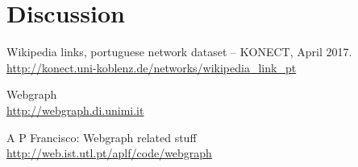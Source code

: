 \documentclass[9pt,a4paper]{article}
\begin{document}
\section{Discussion}

\begin{thebibliography}{9}
Wikipedia links, portuguese network dataset -- KONECT, April 2017.
\\ \url{http://konect.uni-koblenz.de/networks/wikipedia\_link\_pt}

Webgraph
\\ \url{http://webgraph.di.unimi.it}

A P Francisco: Webgraph related stuff
\\ \url{http://web.ist.utl.pt/aplf/code/webgraph}

\end{thebibliography}
\end{document}
